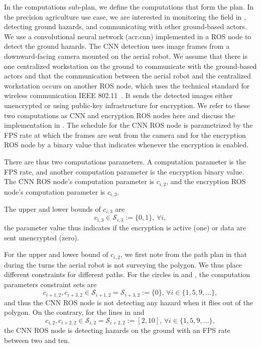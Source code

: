 In the computations sub-plan, we define the computations that form the plan. In the precision agriculture use case, we are interested in monitoring the field in , detecting ground hazards, and communicating with other ground-based actors. We use a convolutional neural network (\Gls{acr:cnn}) implemented in a ROS node to detect the ground hazards. The CNN detection uses image frames from a downward-facing camera mounted on the aerial robot. We assume that there is one centralized workstation on the ground to communicate with the ground-based actors and that the communication between the aerial robot and the centralized workstation occurs on another ROS node, which uses the technical standard for wireless communication IEEE 802.11~\citep{crow1997ieee}. It sends the detected images either unencrypted or using public-key infrastructure for encryption. We refer to these two computations as CNN and encryption ROS nodes here and discuss the implementation in . The schedule for the CNN ROS node is parametrized by the FPS rate at which the frames are sent from the camera and for the encryption ROS node by a binary value that indicates whenever the encryption is enabled.

There are thus two computations parameters. A computation parameter is the FPS rate, and another computation parameter is the encryption binary value. The CNN ROS node's computation parameter is $c_{i,2}$, and the encryption ROS node's computation parameter is $c_{i,3}$.

The upper and lower bounds of $c_{i,3}$ are 
\begin{equation}\label{eq:encr-comp-const}
  c_{i,3}\in\mathcal{S}_{i,3}:=\{0,1\},\,\forall i,
\end{equation}
the parameter value thus indicates if the encryption is active (one) or data are sent unencrypted (zero).

For the upper and lower bound of $c_{i,2}$, we first note from the path plan in  that during the turns the aerial robot is not surveying the polygon. We thus place different constraints for different paths. For the circles in  and , the computation parameters constraint sets are 
\begin{equation}
  c_{i+1,2},c_{i+3,2}\in\mathcal{S}_{i+1,2}=\mathcal{S}_{i+3,2}:=\{0\},\,\forall i\in\{1,5,9,\dots\},
\end{equation}
and thus the CNN ROS node is not detecting any hazard when it flies out of the polygon. On the contrary, for the lines in  and  
\begin{equation}\label{eq:cnn-comp-const}
c_{i,2},c_{i+2,2}\in\mathcal{S}_{i,2}=\mathcal{S}_{i+2,2}:=[2,10],\,\forall i\in\{1,5,9,\dots\},
\end{equation} 
the CNN ROS node is detecting hazards on the ground with an FPS rate between two and ten.

